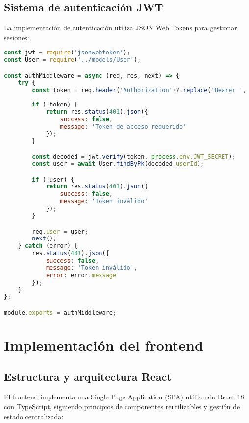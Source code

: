 \subsection{Sistema de autenticación JWT}

La implementación de autenticación utiliza JSON Web Tokens para gestionar sesiones:

\begin{lstlisting}[language=JavaScript, caption=Middleware de autenticación JWT]
const jwt = require('jsonwebtoken');
const User = require('../models/User');

const authMiddleware = async (req, res, next) => {
    try {
        const token = req.header('Authorization')?.replace('Bearer ', '');
        
        if (!token) {
            return res.status(401).json({
                success: false,
                message: 'Token de acceso requerido'
            });
        }

        const decoded = jwt.verify(token, process.env.JWT_SECRET);
        const user = await User.findByPk(decoded.userId);

        if (!user) {
            return res.status(401).json({
                success: false,
                message: 'Token inválido'
            });
        }

        req.user = user;
        next();
    } catch (error) {
        res.status(401).json({
            success: false,
            message: 'Token inválido',
            error: error.message
        });
    }
};

module.exports = authMiddleware;
\end{lstlisting}

\section{Implementación del frontend}

\subsection{Estructura y arquitectura React}

El frontend implementa una Single Page Application (SPA) utilizando React 18 con TypeScript, siguiendo principios de componentes reutilizables y gestión de estado centralizada:

